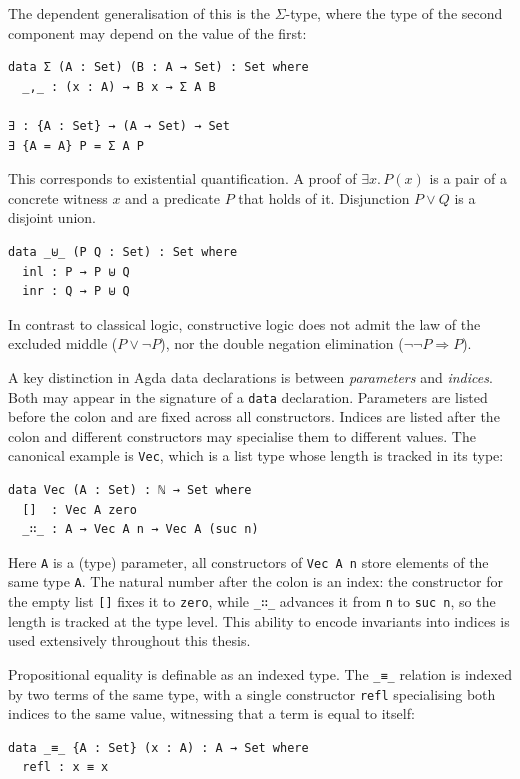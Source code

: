 The dependent generalisation of this is the $\Sigma$-type, where the type of the second component may depend on the value of the first:
\begin{verbatim}
data Σ (A : Set) (B : A → Set) : Set where
  _,_ : (x : A) → B x → Σ A B

∃ : {A : Set} → (A → Set) → Set
∃ {A = A} P = Σ A P
\end{verbatim}
This corresponds to existential quantification. A proof of $\exists x.\, P(x)$ is a pair of a concrete witness $x$ and a predicate $P$ that holds of it.
Disjunction $P \lor Q$ is a disjoint union.
\begin{verbatim}
data _⊎_ (P Q : Set) : Set where
  inl : P → P ⊎ Q
  inr : Q → P ⊎ Q
\end{verbatim}

In contrast to classical logic, constructive logic does not admit the law of the excluded middle ($P \lor \neg P$), nor the double negation elimination ($\neg \neg P \Rightarrow P$).

A key distinction in Agda data declarations is between \textit{parameters} and \textit{indices}.
Both may appear in the signature of a \texttt{data} declaration. Parameters are listed before the colon and are fixed across all constructors.
Indices are listed after the colon and different constructors may specialise them to different values.
The canonical example is \texttt{Vec}, which is a list type whose length is tracked in its type:
\begin{verbatim}
data Vec (A : Set) : ℕ → Set where
  []  : Vec A zero
  _∷_ : A → Vec A n → Vec A (suc n)
\end{verbatim}
Here \texttt{A} is a (type) parameter, all constructors of \texttt{Vec A n} store elements of the same type \texttt{A}.
The natural number after the colon is an index: the constructor for the empty list \texttt{[]} fixes it to \texttt{zero}, while \texttt{\_∷\_} advances it from \texttt{n} to \texttt{suc n}, so the length is tracked at the type level.
This ability to encode invariants into indices is used extensively throughout this thesis.

Propositional equality is definable as an indexed type. 
The \texttt{\_≡\_} relation is indexed by two terms of the same type, with a single constructor \texttt{refl} specialising both indices to the same value, witnessing that a term is equal to itself:
\begin{verbatim}
data _≡_ {A : Set} (x : A) : A → Set where
  refl : x ≡ x
\end{verbatim}

